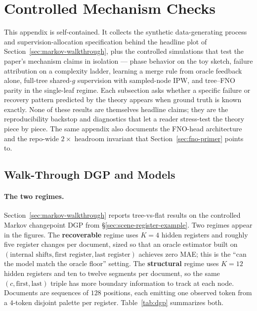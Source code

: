 \section{Controlled Mechanism Checks}\label{app:mechanism-checks}

This appendix is self-contained. It collects the synthetic
data-generating process and supervision-allocation specification
behind the headline plot of Section~\ref{sec:markov-walkthrough},
plus the controlled simulations that test the paper's mechanism
claims in isolation --- phase behavior on the toy sketch, failure
attribution on a complexity ladder, learning a merge rule from oracle
feedback alone, full-tree shared-$g$ supervision with sampled-node
IPW, and tree--FNO parity in the single-leaf regime. Each subsection
asks whether a specific failure or recovery pattern predicted by the
theory appears when ground truth is known exactly. None of these
results are themselves headline claims; they are the reproducibility
backstop and diagnostics that let a reader stress-test the theory
piece by piece. The same appendix also documents the FNO-head
architecture and the repo-wide $2\times$ headroom invariant that
Section~\ref{sec:fno-primer} points to.

\subsection{Walk-Through DGP and Models}\label{app:walkthrough-dgp}

\paragraph{The two regimes.}
Section~\ref{sec:markov-walkthrough} reports tree-vs-flat results on
the controlled Markov changepoint DGP from
\S\ref{sec:scene-register-example}. Two regimes appear in the
figures. The \textbf{recoverable} regime uses $K=4$ hidden registers
and roughly five register changes per document, sized so that an
oracle estimator built on $(\text{internal shifts}, \text{first
register}, \text{last register})$ achieves zero MAE; this is the
``can the model match the oracle floor'' setting. The
\textbf{structural} regime uses $K=12$ hidden registers and ten to
twelve segments per document, so the same $(c, \text{first},
\text{last})$ triple has more boundary information to track at each
node. Documents are sequences of $128$ positions, each emitting one
observed token from a $4$-token disjoint palette per register.
Table~\ref{tab:dgp} summarizes both.

